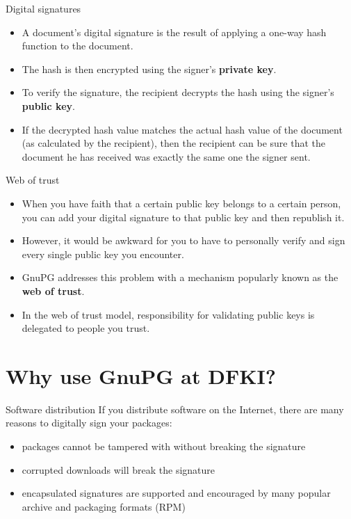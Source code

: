 \documentclass[%
mode=present,%
paper=screen%
]{powerdot}
\begin{document}
\begin{slide}{Digital signatures}
  \begin{itemize}
  \item A document's digital signature is the result of applying a
    one-way hash function to the document.
  \item The hash is then encrypted using the signer's \textbf{private
      key}.
  \item To verify the signature, the recipient decrypts the hash using
    the signer's \textbf{public key}.
  \item If the decrypted hash value matches the actual hash value of
    the document (as calculated by the recipient), then the recipient
    can be sure that the document he has received was exactly the same
    one the signer sent.
  \end{itemize}
\end{slide}

\begin{slide}{Web of trust}
  \begin{itemize}
  \item When you have faith that a certain public key belongs to a
    certain person, you can add your digital signature to that public
    key and then republish it.
  \item However, it would be awkward for you to have to personally
    verify and sign every single public key you encounter.
  \item GnuPG addresses this problem with a mechanism popularly known
    as the \textbf{web of trust}.
  \item In the web of trust model, responsibility for validating
    public keys is delegated to people you trust.
  \end{itemize}
\end{slide}

\section{Why use GnuPG at DFKI?}
\begin{slide}{Software distribution}
  If you distribute software on the Internet, there are many reasons
  to digitally sign your packages:\\[1ex]
  \begin{itemize}
  \item packages cannot be tampered with without breaking the signature
  \item corrupted downloads will break the signature
  \item encapsulated signatures are supported and encouraged by many
    popular archive and packaging formats (\eg RPM)
  \end{itemize}
\end{slide}
\end{document}
